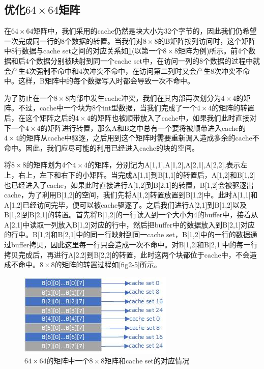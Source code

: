 \documentclass[supercite]{Experimental_Report}
\theoremstyle{definition}
\begin{document}
\subsection{优化$64\times64$矩阵}
在$64\times64$矩阵中，我们采用的cache仍然是块大小为32个字节的，因此我们仍希望一次完成同一行的8个数据的转置。当我们对$8\times8$的B矩阵按列访问时，这个矩阵中8行数据与cache set之间的对应关系如\ref{fig2-4}(以第一个$8\times8$矩阵为例)所示。前4个数据和后4个数据分别被映射到同一个cache set中，在访问一列的8个数据的过程中就会产生4次强制不命中和4次冲突不命中，在访问第二列时又会产生8次冲突不命中。这样，B矩阵中的每个数据写入时都会导致一次不命中。

为了防止在一个$8\times8$内部中发生cache冲突，我们在其内部再次划分为$4\times4$的矩阵。不过，cache中一个块为8个int型数据，当我们完成了一个$4\times4$的矩阵的转置后，在这个矩阵之后的$4\times4$的矩阵也被顺带放入了cache中，如果我们此时直接对下一个$4\times4$的矩阵进行转置，那么A和B之中总有一个要将被顺带进入cache的$4\times4$的矩阵从cache中驱逐，之后用到这个矩阵时需要重新调入造成多余的cache不命中。因此，我们应尽可能的利用已经进入cache的块的空间。

将$8\times8$的矩阵划为4个$4\times4$的矩阵，分别记为A[1,1],A[1,2],A[2,1],A[2,2],表示左上，右上，左下和右下的小矩阵。当完成A[1,1]到B[1,1]的转置后，A[1,2]和B[1,2]也已经进入了cache，如果此时直接进行A[1,2]到B[2,1]的转置，B[1,2]会被驱逐出cache，为了利用B[1,2]的空间，我们先将A[1,2]转置放置到B[1,2]中。此时A[1,1]和A[1,2]已经访问完毕，便可以被cache驱逐了。之后我们进行A[2,1]到B[1,2]以及B[1,2]到B[2,1]的转置。首先将B[1,2]的一行读入到一个大小为4的buffer中，接着从A[2,1]中读取一列放入B[1,2]对应的行中，然后把buffer中的数据放入到B[2,1]对应的行中。B[1,2]和B[2,1]中的同一行映射到同一cache set，B[1,2]中的一行的数据通过buffer拷贝，因此这里每一行只会造成一次不命中。对B[1,2]和B[2,1]中的每一行拷贝完成后，再进行A[2,2]到B[2,2]的转置，此时这两个块都位于cache中，不会造成不命中。$8\times8$的矩阵的转置过程如\ref{fig2-5}所示。

\begin{figure}[htb]
	\begin{center}
		\includegraphics[scale=0.9]{./images/lab2_4.jpg}
		\caption{$64\times64$的矩阵中一个$8\times8$矩阵和cache set的对应情况}
		\label{fig2-4}
	\end{center}
\end{figure}
\end{document}
